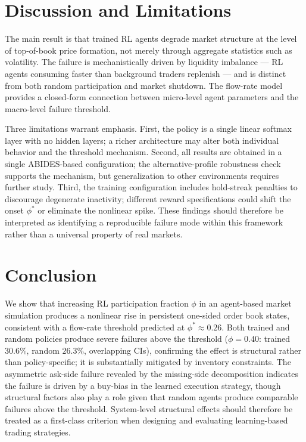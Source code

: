 \documentclass[sigconf]{acmart}
\begin{document}
\FloatBarrier

\section{Discussion and Limitations}

The main result is that trained RL agents degrade market structure at the level of top-of-book price formation, not merely through aggregate statistics such as volatility. The failure is mechanistically driven by liquidity imbalance — RL agents consuming faster than background traders replenish — and is distinct from both random participation and market shutdown. The flow-rate model provides a closed-form connection between micro-level agent parameters and the macro-level failure threshold.

Three limitations warrant emphasis. First, the policy is a single linear softmax layer with no hidden layers; a richer architecture may alter both individual behavior and the threshold mechanism. Second, all results are obtained in a single ABIDES-based configuration; the alternative-profile robustness check supports the mechanism, but generalization to other environments requires further study. Third, the training configuration includes hold-streak penalties to discourage degenerate inactivity; different reward specifications could shift the onset $\phi^*$ or eliminate the nonlinear spike. These findings should therefore be interpreted as identifying a reproducible failure mode within this framework rather than a universal property of real markets.

\section{Conclusion}

We show that increasing RL participation fraction $\phi$ in an agent-based market simulation produces a nonlinear rise in persistent one-sided order book states, consistent with a flow-rate threshold predicted at $\phi^* \approx 0.26$. Both trained and random policies produce severe failures above the threshold ($\phi = 0.40$: trained $30.6\%$, random $26.3\%$, overlapping CIs), confirming the effect is structural rather than policy-specific; it is substantially mitigated by inventory constraints. The asymmetric ask-side failure revealed by the missing-side decomposition indicates the failure is driven by a buy-bias in the learned execution strategy, though structural factors also play a role given that random agents produce comparable failures above the threshold. System-level structural effects should therefore be treated as a first-class criterion when designing and evaluating learning-based trading strategies.



\end{document}
